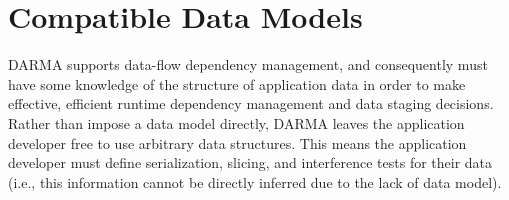 
\section{Compatible Data Models}
\label{sec:datamodel}
\gls{DARMA} supports \gls{data-flow dependency} management, and consequently
must have some knowledge of the structure of application data in order to make
effective, efficient runtime dependency management and data staging decisions.  Rather
than impose a \gls{data model} directly, \gls{DARMA} leaves the application
developer free to use arbitrary data structures.  This means the application
developer must define \gls{serialization}, \gls{slicing}, and \glspl{interference test} for 
their data (i.e., this information cannot be directly inferred due to the lack
of \gls{data model}). 


